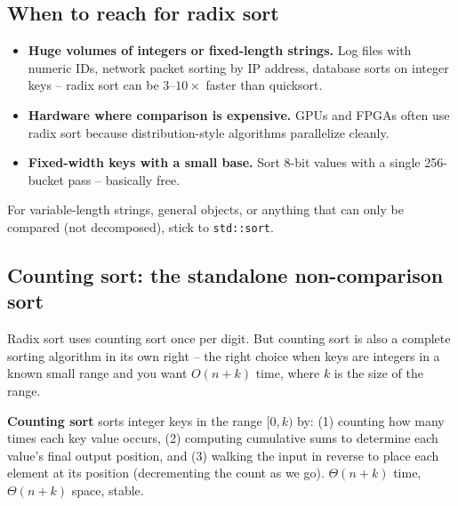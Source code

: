 \documentclass[11pt]{article}
\begin{document}
\subsection{When to reach for radix sort}

\begin{ideabox}
\begin{itemize}[leftmargin=*]
  \item \textbf{Huge volumes of integers or fixed-length strings.}
        Log files with numeric IDs, network packet sorting by IP
        address, database sorts on integer keys -- radix sort can be
        $3$--$10\times$ faster than quicksort.
  \item \textbf{Hardware where comparison is expensive.} GPUs and
        FPGAs often use radix sort because distribution-style
        algorithms parallelize cleanly.
  \item \textbf{Fixed-width keys with a small base.} Sort 8-bit
        values with a single 256-bucket pass -- basically free.
\end{itemize}
For variable-length strings, general objects, or anything that can
only be compared (not decomposed), stick to \texttt{std::sort}.
\end{ideabox}

\subsection{Counting sort: the standalone non-comparison sort}

Radix sort uses counting sort once per digit. But counting sort is
also a complete sorting algorithm in its own right -- the right
choice when keys are integers in a known small range and you want
$O(n + k)$ time, where $k$ is the size of the range.

\begin{defnbox}
\textbf{Counting sort} sorts integer keys in the range $[0, k)$ by:
(1) counting how many times each key value occurs, (2) computing
cumulative sums to determine each value's final output position,
and (3) walking the input in reverse to place each element at its
position (decrementing the count as we go). $\Theta(n + k)$ time,
$\Theta(n + k)$ space, stable.
\end{defnbox}
\end{document}
